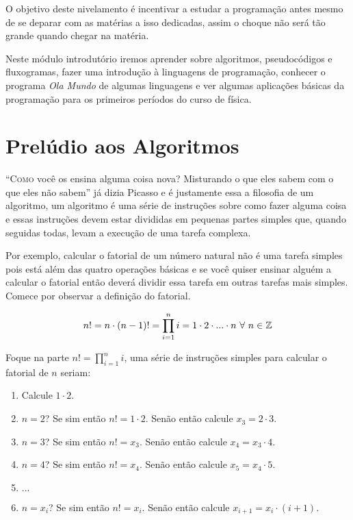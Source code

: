 O objetivo deste nivelamento é incentivar a estudar a programação
antes mesmo de se deparar com as matérias a isso dedicadas, assim o choque
não será tão grande quando chegar na matéria.

Neste módulo introdutório iremos
aprender sobre algoritmos, pseudocódigos e fluxogramas,
fazer uma introdução à linguagens
de programação,
conhecer o programa \textit{Ola Mundo} de algumas
linguagens e ver algumas aplicações básicas da programação
para os primeiros períodos do curso de física.

\chapter{Prelúdio aos Algoritmos}

\lettrine{``C}{omo} você os ensina alguma coisa nova? Misturando o que
eles sabem com o que eles não sabem'' já dizia Picasso e é justamente
essa a filosofia de um algoritmo, um algoritmo é uma série de instruções
sobre como fazer alguma coisa e essas instruções devem estar divididas
em pequenas partes simples que, quando seguidas todas, levam a execução
de uma tarefa complexa.

Por exemplo, calcular o fatorial de um número natural não é uma tarefa simples
pois está além das quatro operações básicas e se você quiser ensinar alguém
a calcular o fatorial então deverá dividir essa tarefa em outras tarefas mais
simples. Comece por observar a definição do fatorial.

\[
n! = n \cdot (n-1)! = \prod_{i=1}^{n} i = 1 \cdot 2 \cdot ... \cdot n ~\forall~n\in\mathbb{Z}
\]

Foque na parte $n! = \prod_{i=1}^{n} i$, uma série de instruções simples para
calcular o fatorial de $n$ seriam:
\begin{enumerate}[nosep]
\item Calcule $1\cdot 2$.
\item $n = 2$? Se sim então $n! = 1\cdot 2$. Senão então calcule $x_3 = 2 \cdot 3$.
\item $n = 3$? Se sim então $n! = x_3$. Senão então calcule $x_4 = x_3 \cdot 4$.
\item $n = 4$? Se sim então $n! = x_4$. Senão então calcule $x_5 = x_4 \cdot 5$.
\item $...$
\item $n = x_i$? Se sim então $n! = x_i$. Senão então calcule $x_{i+1} = x_i \cdot (i+1)$.
\end{enumerate}

